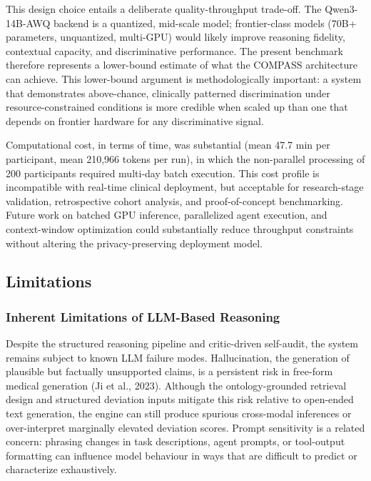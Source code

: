\documentclass[11pt,a4paper,twoside]{article}
\begin{document}
This design choice entails a deliberate quality-throughput trade-off. The Qwen3-14B-AWQ backend is a quantized, mid-scale model; frontier-class models (70B+ parameters, unquantized, multi-GPU) would likely improve reasoning fidelity, contextual capacity, and discriminative performance. The present benchmark therefore represents a lower-bound estimate of what the COMPASS architecture can achieve. This lower-bound argument is methodologically important: a system that demonstrates above-chance, clinically patterned discrimination under resource-constrained conditions is more credible when scaled up than one that depends on frontier hardware for any discriminative signal.

Computational cost, in terms of time, was substantial (mean 47.7 min per participant, mean 210,966 tokens per run), in which the non-parallel processing of 200 participants required multi-day batch execution. This cost profile is incompatible with real-time clinical deployment, but acceptable for research-stage validation, retrospective cohort analysis, and proof-of-concept benchmarking. Future work on batched GPU inference, parallelized agent execution, and context-window optimization could substantially reduce throughput constraints without altering the privacy-preserving deployment model.

\subsection{Limitations}

\subsubsection{Inherent Limitations of LLM-Based Reasoning}

Despite the structured reasoning pipeline and critic-driven self-audit, the system remains subject to known LLM failure modes. Hallucination, the generation of plausible but factually unsupported claims, is a persistent risk in free-form medical generation (Ji et al., 2023). Although the ontology-grounded retrieval design and structured deviation inputs mitigate this risk relative to open-ended text generation, the engine can still produce spurious cross-modal inferences or over-interpret marginally elevated deviation scores. Prompt sensitivity is a related concern: phrasing changes in task descriptions, agent prompts, or tool-output formatting can influence model behaviour in ways that are difficult to predict or characterize exhaustively.
\end{document}
